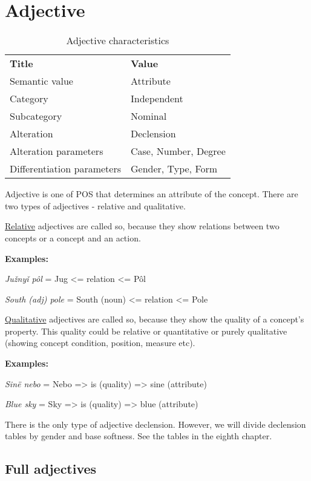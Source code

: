 \section{Adjective}

\begin{table}[h]
	\caption{Adjective characteristics}
	\begin{tabular}{ll}
		\textbf{Title}              & \textbf{Value}               \\
		Semantic value              & Attribute                    \\
		Category                    & Independent                  \\
		Subcategory                 & Nominal                      \\
		Alteration                  & Declension                   \\
		Alteration parameters       & Case, Number, Degree \\
		Differentiation parameters  & Gender, Type, Form
	\end{tabular}
\end{table}

Adjective is one of POS that determines an attribute of the concept. There are two types of adjectives - relative and qualitative. 

\underline{Relative} adjectives are called so, because they show relations between two concepts or a concept and an action.

\textbf{Examples:}

\textit{Južnyǐ pôl} = Jug <= relation <= Pôl

\textit{South (adj) pole} = South (noun) <= relation <= Pole

\underline{Qualitative} adjectives are called so, because they show the quality of a concept’s property. This quality could be relative or quantitative or purely qualitative (showing concept condition, position, measure etc).

\textbf{Examples:}

\textit{Sinë nebo} = Nebo => is (quality) => sine (attribute) 

\textit{Blue sky} = Sky => is (quality) => blue (attribute)

There is the only type of adjective declension. However, we will divide declension tables by gender and base softness. See the tables in the eighth chapter.

\subsection{Full adjectives}

